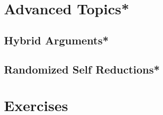 \documentclass[A4, 11pt]{article}
\begin{document}
\section{Advanced Topics*}

\subsection{Hybrid Arguments*}

\subsection{Randomized Self Reductions*}

\section{Exercises}
\end{document}

